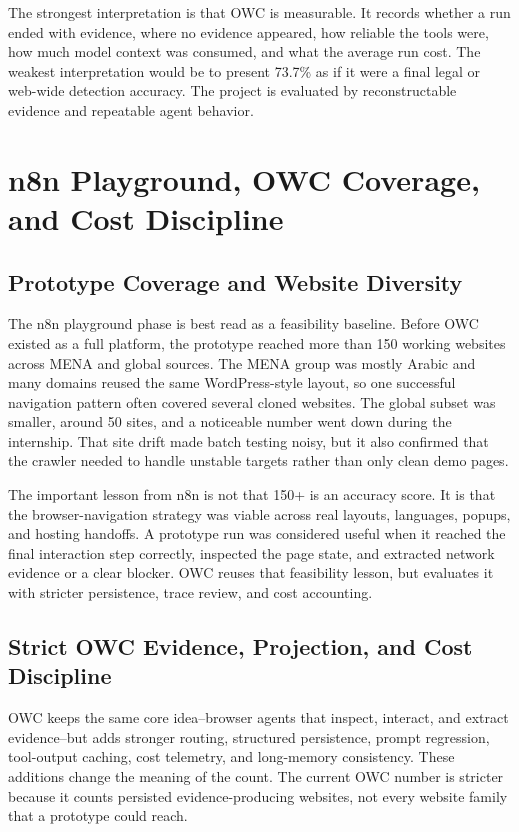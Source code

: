 The strongest interpretation is that OWC is measurable. It records whether a run ended
with evidence, where no evidence appeared, how reliable the tools were, how much model
context was consumed, and what the average run cost. The weakest interpretation would be
to present 73.7\% as if it were a final legal or web-wide detection accuracy. The
project is evaluated by reconstructable evidence and repeatable agent behavior.

\section{n8n Playground, OWC Coverage, and Cost Discipline}

\subsection{Prototype Coverage and Website Diversity}

The n8n playground phase is best read as a feasibility baseline. Before OWC existed as a
full platform, the prototype reached more than 150 working websites across MENA and
global sources. The MENA group was mostly Arabic and many domains reused the same
WordPress-style layout, so one successful navigation pattern often covered several
cloned websites. The global subset was smaller, around 50 sites, and a noticeable number
went down during the internship. That site drift made batch testing noisy, but it also
confirmed that the crawler needed to handle unstable targets rather than only clean demo
pages.

The important lesson from n8n is not that 150+ is an accuracy score. It is that the
browser-navigation strategy was viable across real layouts, languages, popups, and
hosting handoffs. A prototype run was considered useful when it reached the final
interaction step correctly, inspected the page state, and extracted network evidence or
a clear blocker. OWC reuses that feasibility lesson, but evaluates it with stricter
persistence, trace review, and cost accounting.

\subsection{Strict OWC Evidence, Projection, and Cost Discipline}

OWC keeps the same core idea--browser agents that inspect, interact, and extract
evidence--but adds stronger routing, structured persistence, prompt regression,
tool-output caching, cost telemetry, and long-memory consistency. These additions change
the meaning of the count. The current OWC number is stricter because it counts persisted
evidence-producing websites, not every website family that a prototype could reach.

